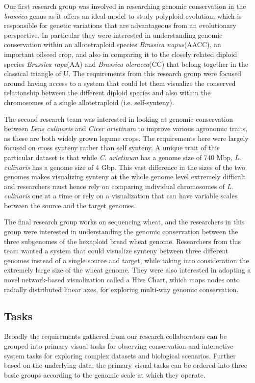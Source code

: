 Our first research group was involved in researching genomic conservation in the \textit{brassica} genus as it offers an ideal model to study polyploid evolution, which is responsible for genetic variations that are advantageous from an evolutionary perspective\cite{madlung2013polyploidy,liu2014brassica}. In particular they were interested in understanding genomic conservation within an allotetraploid species \textit{Brassica napus}(AACC), an important oilseed crop, and also in comparing it to the closely related diploid species \textit{Brassica rapa}(AA) and \textit{Brassica oleracea}(CC) that belong together in the classical triangle of U\cite{nagaharu1935genome}. The requirements from this research group were focused around having access to a system that could let them visualize the conserved relationship between the different diploid species and also within the chromosomes of a single allotetraploid (i.e. self-synteny). 

The second research team was interested in looking at genomic conservation between \textit{Lens culinaris} and \textit{Cicer arietinum} to improve various agronomic traits, as these are both widely grown legume crops. The requirements here were largely focused on cross synteny rather than self synteny. A unique trait of this particular dataset is that while \textit{C. arietinum} has a genome size of 740 Mbp, \textit{L. culinaris} has a genome size of 4 Gbp. This vast difference in the sizes of the two genomes makes visualizing synteny at the whole genome level extremely difficult and researchers must hence rely on comparing individual chromosomes of \textit{L. culinaris} one at a time or rely on a visualization that can have variable scales between the source and the target genomes.


The final research group works on sequencing wheat, and the researchers in this group were interested in understanding the genomic conservation between the three subgenomes of the hexaploid bread wheat genome. Researchers from this team wanted a system that could visualize synteny between three different genomes instead of a single source and target, while taking into consideration the extremely large size of the wheat genome. They were also interested in adopting a novel network-based visualization called a Hive Chart\cite{krzywinski2011hive}, which maps nodes onto radially distributed linear axes, for exploring multi-way genomic conservation.

\subsection{Tasks}
Broadly the requirements gathered from our research collaborators can be grouped into primary visual tasks for observing conservation and interactive system tasks for exploring complex datasets and biological scenarios. Further based on the underlying data, the primary visual tasks can be ordered into three basic groups according to the genomic scale at which they operate.

